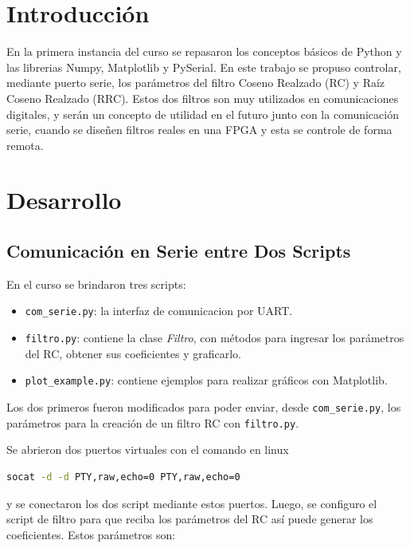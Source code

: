\section{Introducción}

En la primera instancia del curso se repasaron los conceptos básicos de Python y las librerias Numpy, Matplotlib y PySerial. En este trabajo se propuso controlar, mediante puerto serie, los parámetros del filtro Coseno Realzado (RC) y Raíz Coseno Realzado (RRC). Estos dos filtros son muy utilizados en comunicaciones digitales, y serán un concepto de utilidad en el futuro junto con la comunicación serie, cuando se diseñen filtros reales en una FPGA y esta se controle de forma remota.

\section{Desarrollo}

\subsection{Comunicación en Serie entre Dos Scripts}

En el curso se brindaron tres scripts:

\begin{itemize}
    \item \texttt{com\_serie.py}: la interfaz de comunicacion por UART.
    \item \texttt{filtro.py}: contiene la clase \textit{Filtro}, con métodos para ingresar los parámetros del RC, obtener sus coeficientes y graficarlo.
    \item \texttt{plot\_example.py}: contiene ejemplos para realizar gráficos con Matplotlib.
\end{itemize}

Los dos primeros fueron modificados para poder enviar, desde \texttt{com\_serie.py}, los parámetros para la creación de un filtro RC con \texttt{filtro.py}.

Se abrieron dos puertos virtuales con el comando en linux

\begin{lstlisting}[language=bash]
    socat -d -d PTY,raw,echo=0 PTY,raw,echo=0
\end{lstlisting}

\noindent
y se conectaron los dos script mediante estos puertos. Luego, se configuro el script de filtro para que reciba los parámetros del RC así puede generar los coeficientes. Estos parámetros son:

